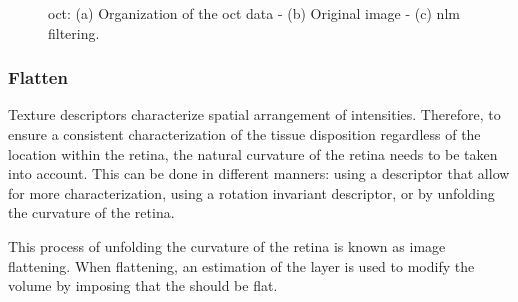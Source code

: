 \begin{figure}[t]
  \centering
  \hspace*{\fill}
   \hfill
   \hfill
  \hspace*{\fill}
  \caption{\ac{oct}: (a) Organization of the \ac{oct} data - (b) Original image - (c) \ac{nlm} filtering.}
  \label{fig:denoise}
\end{figure}

\subsubsection{Flatten}

Texture descriptors characterize spatial arrangement of intensities. 
Therefore, to ensure a consistent characterization of the tissue disposition regardless of the location within the retina, the natural curvature of the retina needs to be taken into account.
This can be done in different manners: using a descriptor that allow for more characterization, using a rotation invariant descriptor, or by unfolding the curvature of the retina. 

This process of unfolding the curvature of the retina is known as image flattening. When flattening, an estimation of the \rpe layer is used to modify the volume by imposing that the \rpe should be flat.




